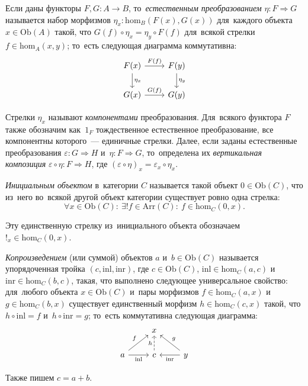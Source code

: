 \documentclass{article}
\begin{document}
Если даны функторы $F, G : A \rightarrow B$, то~\textit{естественным преобразованием} $\eta : F \Rightarrow G$ называется набор морфизмов
$\eta_x : \mathrm{hom}_B(F(x), G(x))$ для~каждого объекта $x \in \mathrm{Ob}(A)$ такой, что $G(f) \circ \eta_x = \eta_y \circ F(f)$
для~всякой стрелки $f \in \mathrm{hom}_A(x, y)$; то~есть следующая диаграмма коммутативна:
\[
  \begin{tikzcd}
    \arrow{d}{\eta_x} F(x) \arrow{r}{F(f)} & F(y) \arrow{d}{\eta_y} \\
                      G(x) \arrow{r}{G(f)} & G(y)
  \end{tikzcd}
\]

Стрелки $\eta_x$ называют \textit{компонентами} преобразования. Для~всякого функтора $F$ также
обозначим как~$1_F$ тождественное естественное преобразование, все компонентны которого~— единичные стрелки.
Далее, если заданы естественные преобразования $\varepsilon : G \Rightarrow H$ и~$\eta : F \Rightarrow G$,
то~определена их \textit{вертикальная композиция} $\varepsilon \circ \eta : F \Rightarrow H$,
где $(\varepsilon \circ \eta)_x = \varepsilon_x \circ \eta_x$.

\textit{Инициальным объектом} в~категории $C$ называется такой объект $0 \in \mathrm{Ob}(C)$,
что из~него во~всякой другой объект категории существует ровно одна стрелка:
$$
  \forall x \in \mathrm{Ob}(C){:}\ \exists! f \in \mathrm{Arr}(C){:}\ f \in \mathrm{hom}_C(0, x).
$$

Эту единственную стрелку из~инициального объекта обозначаем $!_x \in \mathrm{hom}_C(0, x)$.

\textit{Копроизведением} (или суммой) объектов $a$ и~$b \in \mathrm{Ob}(C)$ называется упорядоченная тройка $(c, \mathrm{inl}, \mathrm{inr})$,
где $c \in \mathrm{Ob}(C)$, $\mathrm{inl} \in \mathrm{hom}_C(a, c)$ и~$\mathrm{inr} \in \mathrm{hom}_C(b, c)$, такая, что
выполнено следующее универсальное свойство: для~любого объекта $x \in \mathrm{Ob}(C)$ и~пары морфизмов $f \in \mathrm{hom}_C(a, x)$
и~$g \in \mathrm{hom}_C(b, x)$ существует единственный морфизм $h \in \mathrm{hom}_C(c, x)$ такой, что $h \circ \mathrm{inl} = f$
и~$h \circ \mathrm{inr} = g$; то~есть коммутативна следующая диаграмма:
\[
    \begin{tikzcd}
        & x & \\ a \arrow{r}{}[swap]{\mathrm{inl}} \arrow{ur}{f} & \arrow[dashed]{u}{h} c & \arrow{l}{\mathrm{inr}}[swap]{} \arrow{ul}{}[swap]{g} y
    \end{tikzcd}
\]

Также пишем $c = a + b$.
\end{document}
